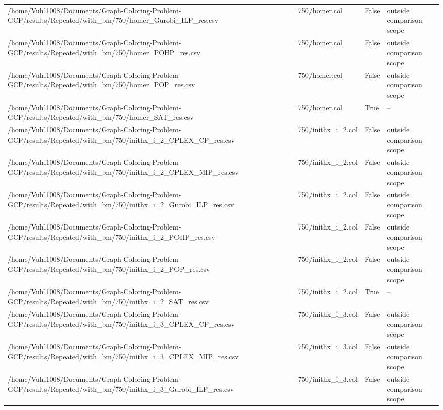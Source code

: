 \begin{table}[htbp]
\begin{tabular}{llll}
/home/Vuhl1008/Documents/Graph-Coloring-Problem-GCP/results/Repeated/with\_bm/750/homer\_Gurobi\_ILP\_res.csv & 750/homer.col & False & outside comparison scope \\
/home/Vuhl1008/Documents/Graph-Coloring-Problem-GCP/results/Repeated/with\_bm/750/homer\_POHP\_res.csv & 750/homer.col & False & outside comparison scope \\
/home/Vuhl1008/Documents/Graph-Coloring-Problem-GCP/results/Repeated/with\_bm/750/homer\_POP\_res.csv & 750/homer.col & False & outside comparison scope \\
/home/Vuhl1008/Documents/Graph-Coloring-Problem-GCP/results/Repeated/with\_bm/750/homer\_SAT\_res.csv & 750/homer.col & True & -- \\
/home/Vuhl1008/Documents/Graph-Coloring-Problem-GCP/results/Repeated/with\_bm/750/inithx\_i\_2\_CPLEX\_CP\_res.csv & 750/inithx\_i\_2.col & False & outside comparison scope \\
/home/Vuhl1008/Documents/Graph-Coloring-Problem-GCP/results/Repeated/with\_bm/750/inithx\_i\_2\_CPLEX\_MIP\_res.csv & 750/inithx\_i\_2.col & False & outside comparison scope \\
/home/Vuhl1008/Documents/Graph-Coloring-Problem-GCP/results/Repeated/with\_bm/750/inithx\_i\_2\_Gurobi\_ILP\_res.csv & 750/inithx\_i\_2.col & False & outside comparison scope \\
/home/Vuhl1008/Documents/Graph-Coloring-Problem-GCP/results/Repeated/with\_bm/750/inithx\_i\_2\_POHP\_res.csv & 750/inithx\_i\_2.col & False & outside comparison scope \\
/home/Vuhl1008/Documents/Graph-Coloring-Problem-GCP/results/Repeated/with\_bm/750/inithx\_i\_2\_POP\_res.csv & 750/inithx\_i\_2.col & False & outside comparison scope \\
/home/Vuhl1008/Documents/Graph-Coloring-Problem-GCP/results/Repeated/with\_bm/750/inithx\_i\_2\_SAT\_res.csv & 750/inithx\_i\_2.col & True & -- \\
/home/Vuhl1008/Documents/Graph-Coloring-Problem-GCP/results/Repeated/with\_bm/750/inithx\_i\_3\_CPLEX\_CP\_res.csv & 750/inithx\_i\_3.col & False & outside comparison scope \\
/home/Vuhl1008/Documents/Graph-Coloring-Problem-GCP/results/Repeated/with\_bm/750/inithx\_i\_3\_CPLEX\_MIP\_res.csv & 750/inithx\_i\_3.col & False & outside comparison scope \\
/home/Vuhl1008/Documents/Graph-Coloring-Problem-GCP/results/Repeated/with\_bm/750/inithx\_i\_3\_Gurobi\_ILP\_res.csv & 750/inithx\_i\_3.col & False & outside comparison scope \\

\end{tabular}
\end{table}
